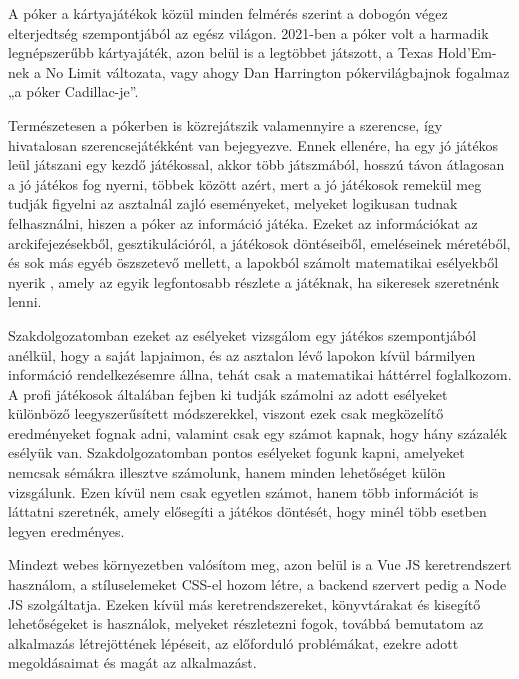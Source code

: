 
A póker a kártyajátékok közül minden felmérés szerint a dobogón végez elterjedtség szempontjából az egész világon. 
2021-ben a póker volt a harmadik legnépszerűbb kártyajáték, azon belül is a legtöbbet játszott, a Texas Hold’Em-nek a No Limit változata, vagy ahogy Dan Harrington pókervilágbajnok fogalmaz „a póker Cadillac-je”\cite{harrington}. 

Természetesen a pókerben is közrejátszik valamennyire a szerencse, %
így hivatalosan szerencsejátékként van bejegyezve. %
Ennek ellenére, ha egy jó játékos %
leül játszani egy kezdő játékossal, akkor több játszmából, hosszú távon átlagosan a jó játékos fog nyerni, %
többek között azért, mert  %
a jó játékosok remekül meg tudják figyelni az asztalnál zajló eseményeket, melyeket logikusan tudnak felhasználni, hiszen a póker az információ játéka. Ezeket az információkat az arckifejezésekből, gesztikulációról, a játékosok döntéseiből, emeléseinek méretéből, és sok más egyéb öszszetevő %
mellett, a lapokból számolt matematikai esélyekből nyerik , %
amely az egyik legfontosabb részlete a játéknak, ha sikeresek szeretnénk lenni.

Szakdolgozatomban ezeket az esélyeket vizsgálom egy játékos szempontjából anélkül, hogy a saját lapjaimon, és az asztalon lévő lapokon kívül bármilyen információ rendelkezésemre állna, tehát csak a matematikai háttérrel foglalkozom. A profi játékosok általában fejben ki tudják számolni az adott esélyeket különböző leegyszerűsített módszerekkel, %
viszont ezek csak megközelítő eredményeket fognak adni, valamint csak egy számot kapnak, hogy hány százalék esélyük van. Szakdolgozatomban pontos esélyeket fogunk kapni, amelyeket nemcsak sémákra illesztve számolunk, hanem minden lehetőséget külön vizsgálunk. Ezen kívül nem csak egyetlen számot, hanem több információt is láttatni szeretnék, amely elősegíti a játékos döntését, hogy minél több esetben legyen eredményes.

Mindezt webes környezetben valósítom meg, azon belül is a Vue JS keretrendszert használom, a stíluselemeket CSS-el hozom létre, a backend szervert pedig a Node JS szolgáltatja. Ezeken kívül más keretrendszereket, könyvtárakat és kisegítő lehetőségeket is használok, melyeket részletezni fogok, továbbá bemutatom az alkalmazás létrejöttének lépéseit, az előforduló problémákat, ezekre adott megoldásaimat és magát az alkalmazást.
